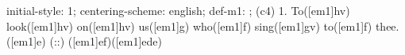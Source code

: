initial-style: 1;
centering-scheme: english;
def-m1: \grealign;
(c4) 1. To([em1]hv) look([em1]hv) on([em1]hv) us([em1]g) who([em1]f) sing([em1]gv) to([em1]f) thee.([em1]e) (::) ([em1]ef)([em1]ede)